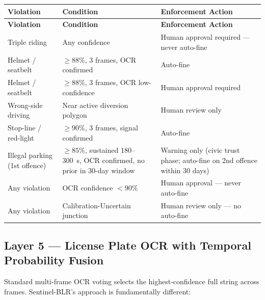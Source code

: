 \documentclass[11pt,a4paper]{article}
\begin{document}
\begin{longtable}{L{3.5cm} L{4.5cm} L{6.5cm}}
    \toprule
    \color{white}\textbf{Violation} & \color{white}\textbf{Condition} & \color{white}\textbf{Enforcement Action} \\
    \midrule
    \endfirsthead
    \toprule
    \color{white}\textbf{Violation} & \color{white}\textbf{Condition} & \color{white}\textbf{Enforcement Action} \\
    \midrule
    \endhead
    \bottomrule
    \endfoot

    Triple riding & Any confidence & Human approval required — never auto-fine \\
    Helmet / seatbelt & $\geq 88\%$, 3 frames, OCR confirmed & Auto-fine \\
    Helmet / seatbelt & $\geq 88\%$, 3 frames, OCR low-confidence & Human approval required \\
    Wrong-side driving & Near active diversion polygon & Human review only \\
    Stop-line / red-light & $\geq 90\%$, 3 frames, signal confirmed & Auto-fine \\
    Illegal parking (1st offence) & $\geq 85\%$, sustained 180--300~s, OCR confirmed, no prior in 30-day window & Warning only (civic trust phase; auto-fine on 2nd offence within 30 days) \\
    Any violation & OCR confidence $< 90\%$ & Human approval — never auto-fine \\
    Any violation & Calibration-Uncertain junction & Human review only — no auto-fine \\
\end{longtable}

\subsection*{Layer 5 — License Plate OCR with Temporal Probability Fusion}

Standard multi-frame OCR voting selects the highest-confidence full string across frames. Sentinel-BLR's approach is fundamentally different:
\end{document}
